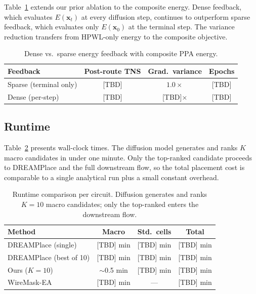 \documentclass[sigconf,anonymous,review,9pt]{acmart}
\begin{document}
Table~\ref{tab:dense_sparse} extends our prior ablation to the composite
energy. Dense feedback, which evaluates $E(\mathbf{x}_t)$ at every
diffusion step, continues to outperform sparse feedback, which evaluates
only $E(\mathbf{x}_0)$ at the terminal step. The variance reduction
transfers from HPWL-only energy to the composite objective.

\begin{table}[t]
\centering
\caption{Dense vs.\ sparse energy feedback with composite PPA energy.}
\label{tab:dense_sparse}
\small
\begin{tabular}{lccc}
\toprule
Feedback & Post-route TNS & Grad.\ variance & Epochs \\
\midrule
Sparse (terminal only) & [TBD] & $1.0\times$ & [TBD] \\
Dense (per-step) & [TBD] & [TBD]$\times$ & [TBD] \\
\bottomrule
\end{tabular}
\end{table}


\subsection{Runtime}

Table~\ref{tab:runtime} presents wall-clock times. The diffusion model
generates and ranks $K$ macro candidates in under one minute. Only the
top-ranked candidate proceeds to DREAMPlace and the full downstream
flow, so the total placement cost is comparable to a single analytical
run plus a small constant overhead.

\begin{table}[t]
\centering
\caption{Runtime comparison per circuit. Diffusion generates and ranks
$K{=}10$ macro candidates; only the top-ranked enters the downstream
flow.}
\label{tab:runtime}
\small
\begin{tabular}{lccc}
\toprule
Method & Macro & Std.\ cells & Total \\
\midrule
DREAMPlace (single) & [TBD] min & [TBD] min & [TBD] min \\
DREAMPlace (best of 10) & [TBD] min & [TBD] min & [TBD] min \\
Ours ($K{=}10$) & ${\sim}$0.5 min & [TBD] min & [TBD] min \\
WireMask-EA & [TBD] min & --- & [TBD] min \\
\bottomrule
\end{tabular}
\end{table}
\end{document}
